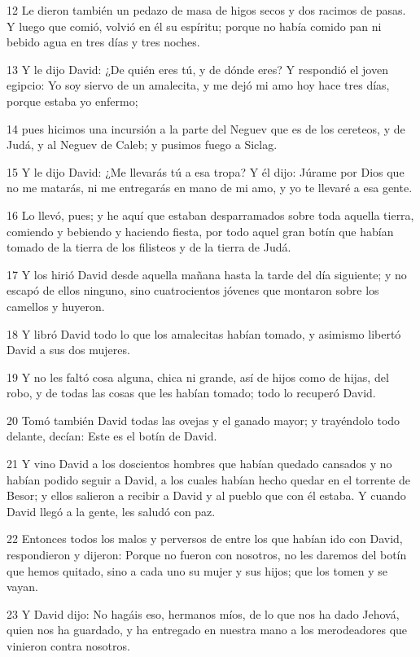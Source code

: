 {\par 12 Le dieron también un pedazo de masa de higos secos y dos racimos de pasas. Y luego que comió, volvió en él su espíritu; porque no había comido pan ni bebido agua en tres días y tres noches.
\par 13 Y le dijo David: ¿De quién eres tú, y de dónde eres? Y respondió el joven egipcio: Yo soy siervo de un amalecita, y me dejó mi amo hoy hace tres días, porque estaba yo enfermo;
\par 14 pues hicimos una incursión a la parte del Neguev que es de los cereteos, y de Judá, y al Neguev de Caleb; y pusimos fuego a Siclag.
\par 15 Y le dijo David: ¿Me llevarás tú a esa tropa? Y él dijo: Júrame por Dios que no me matarás, ni me entregarás en mano de mi amo, y yo te llevaré a esa gente.
\par 16 Lo llevó, pues; y he aquí que estaban desparramados sobre toda aquella tierra, comiendo y bebiendo y haciendo fiesta, por todo aquel gran botín que habían tomado de la tierra de los filisteos y de la tierra de Judá.
\par 17 Y los hirió David desde aquella mañana hasta la tarde del día siguiente; y no escapó de ellos ninguno, sino cuatrocientos jóvenes que montaron sobre los camellos y huyeron.
\par 18 Y libró David todo lo que los amalecitas habían tomado, y asimismo libertó David a sus dos mujeres.
\par 19 Y no les faltó cosa alguna, chica ni grande, así de hijos como de hijas, del robo, y de todas las cosas que les habían tomado; todo lo recuperó David.
\par 20 Tomó también David todas las ovejas y el ganado mayor; y trayéndolo todo delante, decían: Este es el botín de David.
\par 21 Y vino David a los doscientos hombres que habían quedado cansados y no habían podido seguir a David, a los cuales habían hecho quedar en el torrente de Besor; y ellos salieron a recibir a David y al pueblo que con él estaba. Y cuando David llegó a la gente, les saludó con paz.
\par 22 Entonces todos los malos y perversos de entre los que habían ido con David, respondieron y dijeron: Porque no fueron con nosotros, no les daremos del botín que hemos quitado, sino a cada uno su mujer y sus hijos; que los tomen y se vayan.
\par 23 Y David dijo: No hagáis eso, hermanos míos, de lo que nos ha dado Jehová, quien nos ha guardado, y ha entregado en nuestra mano a los merodeadores que vinieron contra nosotros.
}
